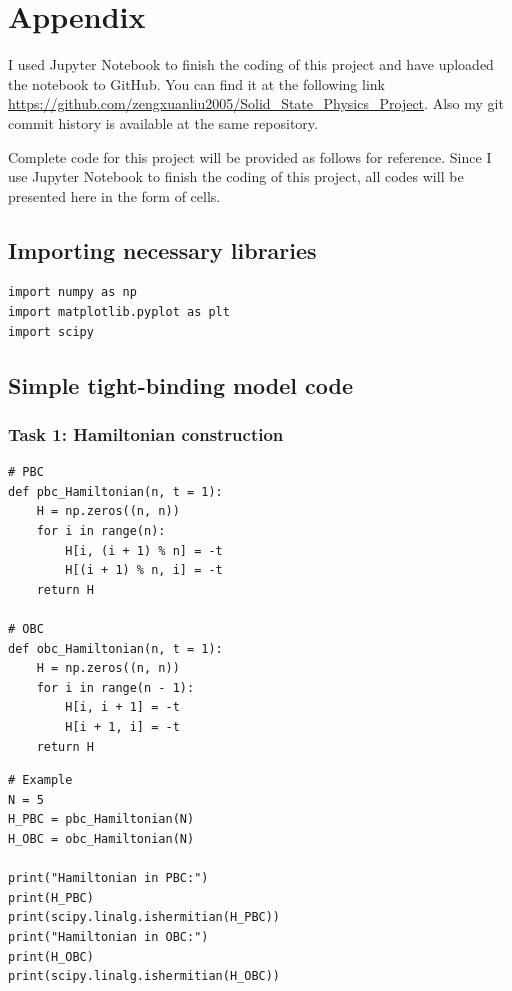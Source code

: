 \documentclass{report}
\begin{document}
\appendix
\chapter*{Appendix}

I used Jupyter Notebook to finish the coding of this project and have uploaded the notebook to GitHub. You can find it at the following link \url{https://github.com/zengxuanliu2005/Solid_State_Physics_Project}. Also my git commit history is available at the same repository.

Complete code for this project will be provided as follows for reference. Since I use Jupyter Notebook to finish the coding of this project, all codes will be presented here in the form of cells.

\section*{Importing necessary libraries}

\begin{lstlisting}
import numpy as np
import matplotlib.pyplot as plt
import scipy
\end{lstlisting}

\section*{Simple tight-binding model code}
\subsection*{Task 1: Hamiltonian construction}

\begin{lstlisting}
# PBC 
def pbc_Hamiltonian(n, t = 1):
    H = np.zeros((n, n))
    for i in range(n):
        H[i, (i + 1) % n] = -t
        H[(i + 1) % n, i] = -t
    return H

# OBC
def obc_Hamiltonian(n, t = 1):
    H = np.zeros((n, n))
    for i in range(n - 1):
        H[i, i + 1] = -t
        H[i + 1, i] = -t
    return H
\end{lstlisting}

\begin{lstlisting}
# Example
N = 5
H_PBC = pbc_Hamiltonian(N)
H_OBC = obc_Hamiltonian(N)

print("Hamiltonian in PBC:")
print(H_PBC)
print(scipy.linalg.ishermitian(H_PBC))
print("Hamiltonian in OBC:")
print(H_OBC)
print(scipy.linalg.ishermitian(H_OBC))
\end{lstlisting}
\end{document}
